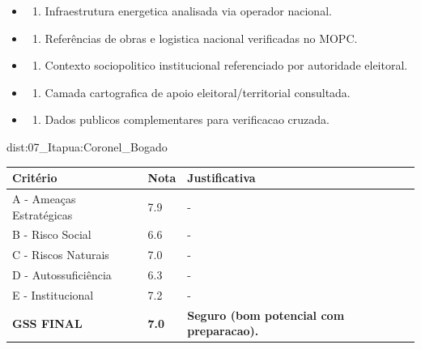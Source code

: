 {\begin{itemize}
\item
  \begin{enumerate}
  \def\labelenumi{\arabic{enumi})}
  \setcounter{enumi}{7}
  \tightlist
  \item
    Infraestrutura energetica analisada via operador nacional.
  \end{enumerate}
\item
  \begin{enumerate}
  \def\labelenumi{\arabic{enumi})}
  \setcounter{enumi}{8}
  \tightlist
  \item
    Referências de obras e logistica nacional verificadas no MOPC.
  \end{enumerate}
\item
  \begin{enumerate}
  \def\labelenumi{\arabic{enumi})}
  \setcounter{enumi}{9}
  \tightlist
  \item
    Contexto sociopolitico institucional referenciado por autoridade
    eleitoral.
  \end{enumerate}
\item
  \begin{enumerate}
  \def\labelenumi{\arabic{enumi})}
  \setcounter{enumi}{10}
  \tightlist
  \item
    Camada cartografica de apoio eleitoral/\allowbreak territorial consultada.
  \end{enumerate}
\item
  \begin{enumerate}
  \def\labelenumi{\arabic{enumi})}
  \setcounter{enumi}{11}
  \tightlist
  \item
    Dados publicos complementares para verificacao cruzada.
  \end{enumerate}
\end{itemize}}{dist:07_Itapua:Coronel_Bogado}
\begin{table}[ht!]
\small \begin{tabular}{p{3.0cm}p{0.8cm}p{6.0cm}} \toprule
\textbf{Critério} & \textbf{Nota} & \textbf{Justificativa} \\ \midrule
A - Ameaças Estratégicas & 7.9 & - \\
B - Risco Social & 6.6 & - \\
C - Riscos Naturais & 7.0 & - \\
D - Autossuficiência & 6.3 & - \\
E - Institucional & 7.2 & - \\
\midrule \textbf{GSS FINAL} & \textbf{7.0} & \textbf{Seguro (bom potencial com preparacao).} \\ \bottomrule \end{tabular}
\end{table}
